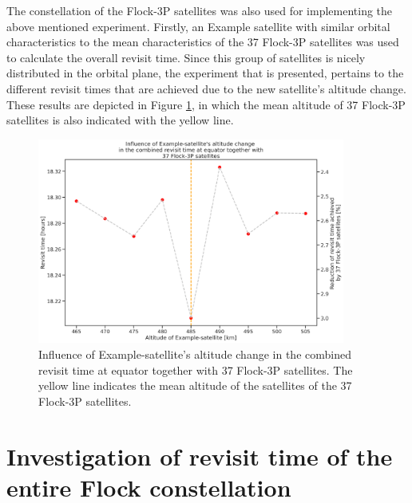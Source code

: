 
The constellation of the Flock-3P satellites was also used for implementing the above mentioned experiment. Firstly, an Example satellite with similar orbital characteristics to the mean characteristics of the 37 Flock-3P satellites was used to calculate the overall revisit time. Since this group of satellites is nicely distributed in the orbital plane, the experiment that is presented, pertains to the different revisit times that are achieved due to the new satellite's altitude change. These results are depicted in Figure \ref{revisit_time_ofdoubleaxisaltitude_Flocks}, in which the mean altitude of 37 Flock-3P satellites is also indicated with the yellow line.


\begin{figure}
\centering
\includegraphics[width=0.9\textwidth]{Images/revisit_time_ofdoubleaxisaltitude_Flocks.png}
\caption{Influence of Example-satellite's altitude change in the combined revisit time at equator together with 37 Flock-3P satellites. The yellow line indicates the mean altitude of the satellites of the 37 Flock-3P satellites.}
\label{revisit_time_ofdoubleaxisaltitude_Flocks}
\end{figure}

\bigskip
\section{Investigation of revisit time of the entire Flock constellation}
\bigskip

